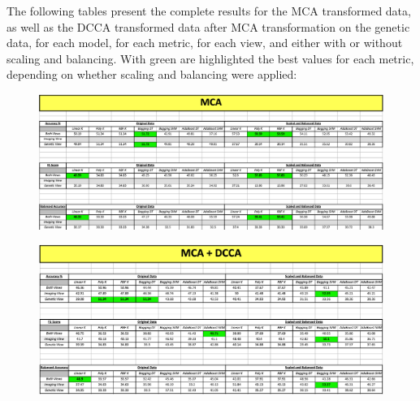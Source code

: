 {%

The following tables present the complete results for the MCA transformed data, as well as the DCCA transformed data after MCA transformation on the genetic data, for each model, for each metric, for each view, and either with or without scaling and balancing. With green are highlighted the best values for each metric, depending on whether scaling and balancing were applied:

\begin{figure} [H]
    \centering
    \includegraphics[width=\textwidth]{figures/Results/Analytical_Table_MCA.png}
    \caption[]{}
    \label{fig: Summary Table for classification scores for MCA transformed data}
\end{figure}

\begin{figure} [H]
    \centering
    \includegraphics[width=\textwidth]{figures/Results/Analytical_Table_MCA_DCCA.png}
    \caption[]{}
    \label{fig: Summary Table for classification scores for MCA - DCCA transformed data}
\end{figure}

}